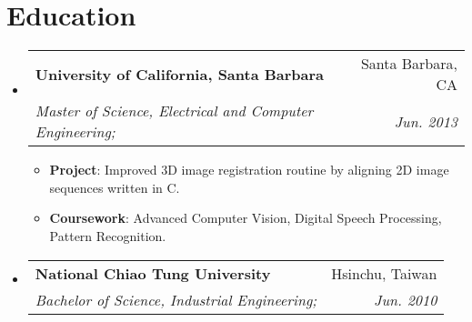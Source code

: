 \documentclass[letterpaper,12pt]{article}
\makeatletter
\newcommand{\resumeItem}[2]{
  \item\small{
    \textbf{#1}{: #2 \vspace{-2pt}}
  }
}
\newcommand{\resumeSubheading}[4]{
  \vspace{-1pt}\item
    \begin{tabular*}{0.97\textwidth}{l@{\extracolsep{\fill}}r}
      \textbf{#1} & #2 \\
      \textit{\small#3} & \textit{\small #4} \\
    \end{tabular*}\vspace{-5pt}
}
\newcommand{\resumeSubHeadingListStart}{\begin{itemize}[leftmargin=*]}
\newcommand{\resumeSubHeadingListEnd}{\end{itemize}}
\newcommand{\resumeItemListStart}{\begin{itemize}}
\newcommand{\resumeItemListEnd}{\end{itemize}\vspace{-5pt}}
\makeatother
\begin{document}
\section{Education}
  \resumeSubHeadingListStart
    \resumeSubheading
      {University of California, Santa Barbara}{Santa Barbara, CA}
      {Master of Science, Electrical and Computer Engineering;}{Jun. 2013}
    \resumeItemListStart
        \resumeItem{Project}
          {Improved 3D image registration routine by aligning 2D image sequences written in C.}
        \resumeItem{Coursework}
          {Advanced Computer Vision, Digital Speech Processing, Pattern Recognition.}
     \resumeItemListEnd
    \resumeSubheading
      {National Chiao Tung University}{Hsinchu, Taiwan}
      {Bachelor of Science, Industrial Engineering;}{Jun. 2010}
  \resumeSubHeadingListEnd

\end{document}
